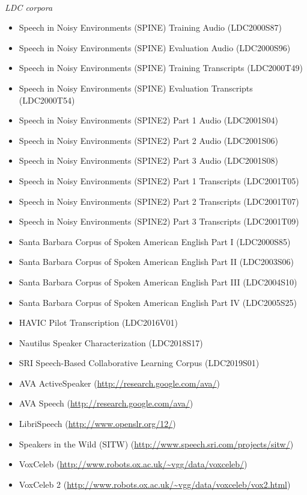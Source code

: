 \documentclass{article}
\begin{document}
\begin{appendices}
\vspace{0.5cm}
 \\
{\it LDC corpora}
\begin{itemize}
    \item Speech in Noisy Environments (SPINE) Training Audio (LDC2000S87)
    \item Speech in Noisy Environments (SPINE) Evaluation Audio (LDC2000S96)
    \item Speech in Noisy Environments (SPINE) Training Transcripts (LDC2000T49)
    \item Speech in Noisy Environments (SPINE) Evaluation Transcripts (LDC2000T54)
    \item Speech in Noisy Environments (SPINE2) Part 1 Audio (LDC2001S04)
    \item Speech in Noisy Environments (SPINE2) Part 2 Audio (LDC2001S06)
    \item Speech in Noisy Environments (SPINE2) Part 3 Audio (LDC2001S08)
    \item Speech in Noisy Environments (SPINE2) Part 1 Transcripts (LDC2001T05)
    \item Speech in Noisy Environments (SPINE2) Part 2 Transcripts (LDC2001T07)
    \item Speech in Noisy Environments (SPINE2) Part 3 Transcripts (LDC2001T09)
	\item Santa Barbara Corpus of Spoken American English Part I (LDC2000S85)
    \item Santa Barbara Corpus of Spoken American English Part II (LDC2003S06)
    \item Santa Barbara Corpus of Spoken American English Part III (LDC2004S10)
    \item Santa Barbara Corpus of Spoken American English Part IV (LDC2005S25)
    \item HAVIC Pilot Transcription (LDC2016V01)
    \item Nautilus Speaker Characterization (LDC2018S17)
    \item SRI Speech-Based Collaborative Learning Corpus (LDC2019S01)
\end{itemize}

\vspace{0.25cm}
\begin{itemize}
    \item AVA ActiveSpeaker (\url{http://research.google.com/ava/})
    \item AVA Speech (\url{http://research.google.com/ava/})
    \item LibriSpeech (\url{http://www.openslr.org/12/})
    \item Speakers in the Wild (SITW) (\url{http://www.speech.sri.com/projects/sitw/})
    \item VoxCeleb (\url{http://www.robots.ox.ac.uk/~vgg/data/voxceleb/})
    \item VoxCeleb 2 (\url{http://www.robots.ox.ac.uk/~vgg/data/voxceleb/vox2.html})
\end{itemize}





\end{appendices}
\end{document}
